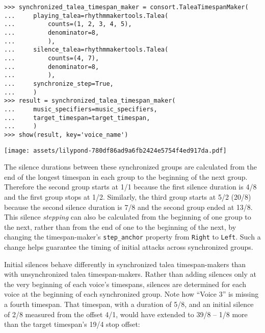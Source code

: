 \begin{singlespacing}
\vspace{-0.5\baselineskip}
\begin{lstlisting}
>>> synchronized_talea_timespan_maker = consort.TaleaTimespanMaker(
...     playing_talea=rhythmmakertools.Talea(
...         counts=(1, 2, 3, 4, 5),
...         denominator=8,
...         ),
...     silence_talea=rhythmmakertools.Talea(
...         counts=(4, 7),
...         denominator=8,
...         ),
...     synchronize_step=True,
...     )
>>> result = synchronized_talea_timespan_maker(
...     music_specifiers=music_specifiers,
...     target_timespan=target_timespan,
...     )
>>> show(result, key='voice_name')
\end{lstlisting}
\noindent\texttt{[image: assets/lilypond-780df86ad9a6fb2424e5754f4ed917da.pdf]}
\end{singlespacing}

\noindent The silence durations between these synchronized groups are
calculated from the end of the longest timespan in each group to the beginning
of the next group. Therefore the second group starts at 1/1 because the first
silence duration is 4/8 and the first group stops at 1/2. Similarly, the third
group starts at 5/2 (20/8) because the second silence duration is 7/8 and the
second group ended at 13/8. This silence \emph{stepping} can also be calculated
from the beginning of one group to the next, rather than from the end of one to
the beginning of the next, by changing the timespan-maker's
\texttt{step\_anchor} property from \texttt{Right} to \texttt{Left}. Such a
change helps guarantee the timing of initial attacks across synchronized
groups.

Initial silences behave differently in synchronized talea timespan-makers than
with unsynchronized talea timespan-makers. Rather than adding silences only at
the very beginning of each voice's timespans, silences are determined for each
voice at the beginning of each synchronized group. Note how \enquote{Voice 3}
is missing a fourth timespan. That timespan, with a duration of 5/8, and an
initial silence of 2/8 measured from the offset 4/1, would have extended to
39/8 -- 1/8 more than the target timespan's 19/4 stop offset:

\begin{comment}
<abjad>
synchronized_talea_timespan_maker = new(
    synchronized_talea_timespan_maker,
    initial_silence_talea=rhythmmakertools.Talea(
        counts=(0, 1, 2),
        denominator=8,
        ),
    )
result = synchronized_talea_timespan_maker(
    music_specifiers=music_specifiers,
    target_timespan=target_timespan,
    )
show(result, key='voice_name')
</abjad>
\end{comment}


